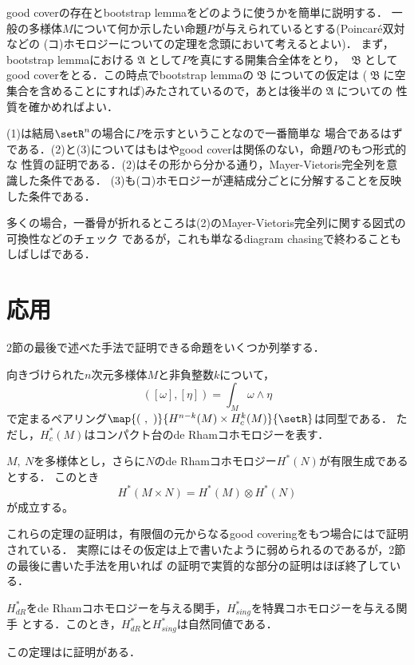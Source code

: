 \documentclass[uplatex]{jsarticle}
\begin{document}
good coverの存在とbootstrap lemmaをどのように使うかを簡単に説明する．
一般の多様体$M$について何か示したい命題$P$が与えられているとする(Poincar\'{e}双対などの
(コ)ホモロジーについての定理を念頭において考えるとよい)．
まず，bootstrap lemmaにおける$\mfrakA$として$P$を真にする開集合全体をとり，
$\mfrakB$としてgood coverをとる．この時点でbootstrap lemmaの$\mfrakB$についての仮定は
($\mfrakB$に空集合を含めることにすれば)みたされているので，あとは後半の$\mfrakA$についての
性質を確かめればよい．

(1)は結局$\setR^n$の場合に$P$を示すということなので一番簡単な
場合であるはずである．(2)と(3)についてはもはやgood coverは関係のない，命題$P$のもつ形式的な
性質の証明である．(2)はその形から分かる通り，Mayer-Vietoris完全列を意識した条件である．
(3)も(コ)ホモロジーが連結成分ごとに分解することを反映した条件である．

多くの場合，一番骨が折れるところは(2)のMayer-Vietoris完全列に関する図式の可換性などのチェック
であるが，これも単なるdiagram chasingで終わることもしばしばである．

\section{応用}
2節の最後で述べた手法で証明できる命題をいくつか列挙する．

\begin{theorem}[de RhamコホモロジーのPoincar\'{e}双対]
  向きづけられた$n$次元多様体$M$と非負整数$k$について，
    \[([\omega],[\eta])=\int_M \omega\wedge \eta\]
  で定まるペアリング$\map{(\ ,\ )}{H^{n-k}(M)\times H^k_c(M)}{\setR}$は同型である．
  ただし，$H^\ast_c(M)$はコンパクト台のde Rhamコホモロジーを表す．
\end{theorem}

\begin{theorem}
  $M,\ N$を多様体とし，さらに$N$のde Rhamコホモロジー$H^\ast(N)$が有限生成であるとする．
  このとき
    \[H^\ast(M\times N)=H^\ast(M)\otimes H^\ast(N)\]
  が成立する。
\end{theorem}

これらの定理の証明は，有限個の元からなるgood coveringをもつ場合には\cite{Bott--Tu}で証明されている．
実際にはその仮定は上で書いたように弱められるのであるが，2節の最後に書いた手法を用いれば
\cite{Bott--Tu}の証明で実質的な部分の証明はほぼ終了している．

\begin{theorem}
  $H_{dR}^\ast$をde Rhamコホモロジーを与える関手，$H_{sing}^\ast$を特異コホモロジーを与える関手
  とする．このとき，$H_{dR}^\ast$と$H_{sing}^\ast$は自然同値である．
\end{theorem}

この定理は\cite{LeeSmooth}に証明がある．




\end{document}
